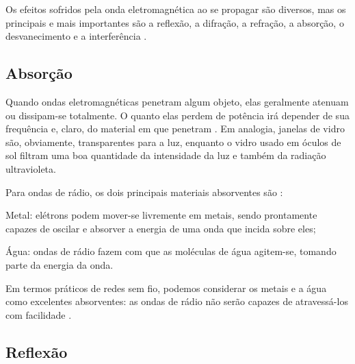 Os efeitos sofridos pela onda eletromagnética ao se propagar são diversos, mas os principais e mais importantes são a reflexão, a difração, a refração, a absorção, o desvanecimento e a interferência \cite{flickenger2008,haykin2008,rappaport2009}.

\subsection{Absorção}
\label{sub:absorcao}

Quando ondas eletromagnéticas penetram algum objeto, elas geralmente atenuam ou dissipam-se totalmente. O quanto elas perdem de potência irá depender de sua frequência e, claro, do material em que penetram \cite{flickenger2008}. Em analogia, janelas de vidro são, obviamente, transparentes para a luz, enquanto o vidro usado em óculos de sol filtram uma boa quantidade da intensidade da luz e também da radiação ultravioleta.
\begin{figure}[H]
	\centering
\end{figure}

Para ondas de rádio, os dois principais materiais absorventes são \cite{flickenger2008}:

\begin{alineascomnumero}
	\item Metal: elétrons podem mover-se livremente em metais, sendo prontamente capazes de oscilar e absorver a energia de uma onda que incida sobre eles;
	\item Água: ondas de rádio fazem com que as moléculas de água agitem-se, tomando parte da energia da onda.
\end{alineascomnumero}

Em termos práticos de redes sem fio, podemos considerar os metais e a água como excelentes absorventes: as ondas de rádio não serão capazes de atravessá-los com facilidade \cite{flickenger2008}.

\subsection{Reflexão}
\label{sub:reflexao}

